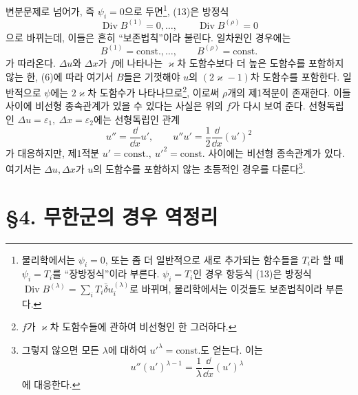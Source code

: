변분문제로 넘어가, 즉 \(\psi_i=0\)으로 두면\footnote{물리학에서는 \(\psi_i=0\), 또는 좀 더 일반적으로 새로 추가되는 함수들을 \(T_i\)라 할 때 \(\psi_i=T_i\)를 ``장방정식''이라 부른다. \(\psi_i=T_i\)인 경우 항등식 (13)은 방정식 \(\operatorname{Div}B^{(\lambda)}=\sum_iT_i\bar\delta u_i^{(\lambda)}\)로 바뀌며, 물리학에서는 이것들도 보존법칙이라 부른다.}, (13)은 방정식
\[
\operatorname{Div}B^{(1)}=0,\ldots,\qquad
\operatorname{Div}B^{(\rho)}=0
\]
으로 바뀌는데, 이들은 흔히 ``보존법칙''이라 불린다. 일차원인 경우에는
\[
B^{(1)}=\mathrm{const.},\ldots,\qquad
B^{(\rho)}=\mathrm{const.}
\]
가 따라온다. \(\Delta u\)와 \(\Delta x\)가 \(f\)에 나타나는 \(\varkappa\)차 도함수보다 더 높은 도함수를 포함하지 않는 한, (6)에 따라 여기서 \(B\)들은 기껏해야 \(u\)의 \((2\varkappa-1)\)차 도함수를 포함한다. 일반적으로 \(\psi\)에는 \(2\varkappa\)차 도함수가 나타나므로\footnote{\(f\)가 \(\varkappa\)차 도함수들에 관하여 비선형인 한 그러하다.}, 이로써 \(\rho\)개의 제1적분이 존재한다. 이들 사이에 비선형 종속관계가 있을 수 있다는 사실은 위의 \(f\)가 다시 보여 준다. 선형독립인 \(\Delta u=\varepsilon_1,\ \Delta x=\varepsilon_2\)에는 선형독립인 관계
\[
u''=\frac{\dd}{\dd x}u',\qquad
u''u'=\frac12\frac{\dd}{\dd x}(u')^2
\]
가 대응하지만, 제1적분 \(u'=\mathrm{const.},\ u'^2=\mathrm{const.}\) 사이에는 비선형 종속관계가 있다. 여기서는 \(\Delta u,\Delta x\)가 \(u\)의 도함수를 포함하지 않는 초등적인 경우를 다룬다\footnote{그렇지 않으면 모든 \(\lambda\)에 대하여 \(u'^\lambda=\mathrm{const.}\)도 얻는다. 이는
\[
u''(u')^{\lambda-1}=\frac1\lambda\frac{\dd}{\dd x}(u')^\lambda
\]
에 대응한다.}.

\bigskip
\section*{\S{}4. 무한군의 경우 역정리}

